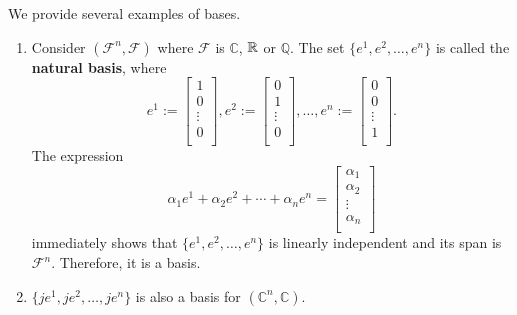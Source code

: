 \begin{example}
\label{ex:bases}
We provide several examples of bases.
\begin{enumerate}
        \renewcommand{\labelenumi}{(\alph{enumi})}
        \setlength{\itemsep}{.1cm}
    \item Consider $(\mathcal{F}^n,\mathcal{F})$ where $\mathcal{F}$ is $\mathbb{C}$, $\mathbb R$ or $\mathbb{Q}$. The set $\{ e^1, e^2, \ldots, e^n \}$ is called the \textbf{natural basis}, where
    $$e^1:=\begin{bmatrix}
    1\\
    0\\
    \vdots\\
    0\\
    \end{bmatrix}, e^2:=\begin{bmatrix}
    0\\
    1\\
    \vdots\\
    0\\
    \end{bmatrix}, \ldots, e^n:=\begin{bmatrix}
    0\\
    0\\
    \vdots\\
    1\\
    \end{bmatrix}.$$
    The expression 
    $$ \alpha_1 e^1 + \alpha_2 e^2 + \cdots + \alpha_n e^n = \begin{bmatrix}
    \alpha_1\\
    \alpha_2\\
    \vdots\\
    \alpha_n\\
    \end{bmatrix}$$
    immediately shows that  $\{e^1,e^2,\ldots,e^n\}$ is linearly independent and its span is $\mathcal{F}^n$. Therefore, it is a basis.
    
    \item $\{je^1, je^2, \ldots, je^n\}$ is also a basis for $(\mathbb{C}^n,\mathbb{C})$. 


\end{enumerate}
\end{example}
